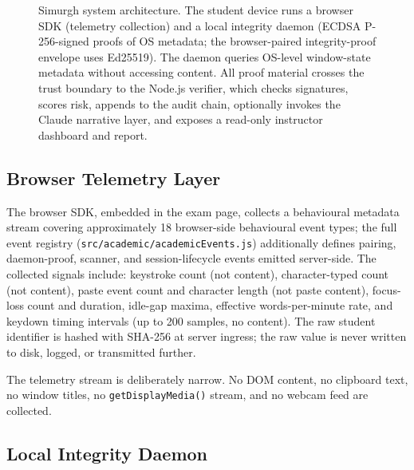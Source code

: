 \documentclass[conference]{IEEEtran}
\begin{document}
\begin{figure}[t]
\caption{Simurgh system architecture. The student device runs a browser SDK (telemetry collection) and a local integrity daemon (ECDSA P-256-signed proofs of OS metadata; the browser-paired integrity-proof envelope uses Ed25519). The daemon queries OS-level window-state metadata without accessing content. All proof material crosses the trust boundary to the Node.js verifier, which checks signatures, scores risk, appends to the audit chain, optionally invokes the Claude narrative layer, and exposes a read-only instructor dashboard and report.}
\label{fig:architecture}
\end{figure}

\subsection{Browser Telemetry Layer}

The browser SDK, embedded in the exam page, collects a behavioural metadata stream covering approximately 18 browser-side behavioural event types; the full event registry (\texttt{src/academic/academicEvents.js}) additionally defines pairing, daemon-proof, scanner, and session-lifecycle events emitted server-side. The collected signals include: keystroke count (not content), character-typed count (not content), paste event count and character length (not paste content), focus-loss count and duration, idle-gap maxima, effective words-per-minute rate, and keydown timing intervals (up to 200 samples, no content). The raw student identifier is hashed with SHA-256 at server ingress; the raw value is never written to disk, logged, or transmitted further.

The telemetry stream is deliberately narrow. No DOM content, no clipboard text, no window titles, no \texttt{getDisplayMedia()} stream, and no webcam feed are collected.

\subsection{Local Integrity Daemon}
\end{document}
